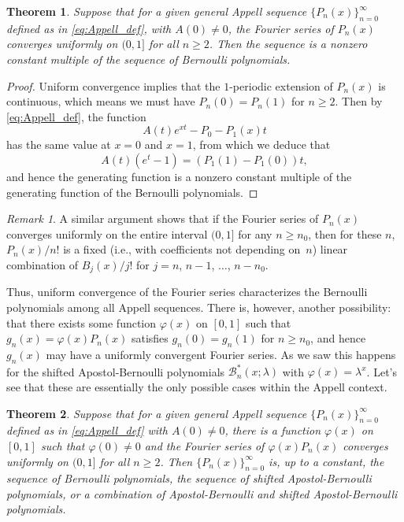 \documentclass[11pt,a4paper]{amsart}
\newcommand{\AB}{\mathcal{B}}
\theoremstyle{plain}
\newtheorem{theorem}{Theorem}
\theoremstyle{plain}
\theoremstyle{plain}
\theoremstyle{remark}
\newtheorem*{remark}{Remark}
\begin{document}
\begin{theorem}
\label{T:BernUnif}
Suppose that for a given general Appell sequence $\{P_{n}(x)\}_{n=0}^\infty$ defined as in \eqref{eq:Appell_def}, with $A(0) \ne 0$, the Fourier series of $P_{n}(x)$ converges uniformly on $(0,1]$ for all $n \ge 2$. Then the sequence is a nonzero constant multiple of the sequence of Bernoulli polynomials.
\end{theorem}


\begin{proof}
Uniform convergence implies that the $1$-periodic extension of $P_{n}(x)$ is continuous, which means we must have $P_n(0)=P_n(1)$ for $n \ge 2$. Then by \eqref{eq:Appell_def}, the function
\[
  A(t)e^{xt}-P_0-P_1(x)t
\]
has the same value at $x=0$ and $x=1$, from which we deduce that
\[
  A(t)(e^t-1) = (P_1(1)-P_1(0))t,
\]
and hence the generating function is a nonzero constant multiple of the generating function of the Bernoulli polynomials.
\end{proof}


\begin{remark}
\label{R:BernUnif}
A similar argument shows that if the Fourier series of $P_{n}(x)$ converges uniformly on the entire interval $(0,1]$ for any $n \ge n_{0}$, then for these $n$,
$P_{n}(x)/n!$ is a fixed (i.e., with coefficients not depending on~$n$)
linear combination of $B_j(x)/j!$ for $j=n$, $n-1$, $\dots$, $n-n_0$.
\end{remark}

Thus, uniform convergence of the Fourier series characterizes the Bernoulli polynomials among all Appell sequences. There is, however, another possibility: that there exists some function $\varphi(x)$ on $[0,1]$ such that $g_n(x) = \varphi(x)P_n(x)$ satisfies $g_n(0)=g_n(1)$ for $n\ge n_0$, and hence $g_n(x)$ may have a uniformly convergent Fourier series. As we saw this happens for the shifted Apostol-Bernoulli polynomials $\AB^*_n(x;\lambda)$ with $\varphi(x)=\lambda^x$. Let's see that these are essentially the only possible cases within the Appell context.

\begin{theorem}
\label{T:SoloAB}
Suppose that for a given general Appell sequence $\{P_{n}(x)\}_{n=0}^\infty$ defined as in \eqref{eq:Appell_def} with $A(0) \ne 0$, there is a function $\varphi(x)$ on $[0,1]$ such that $\varphi(0) \neq 0$ and the Fourier series of $\varphi(x)P_{n}(x)$ converges uniformly on $(0,1]$ for all $n \ge 2$.
Then $\{P_{n}(x)\}_{n=0}^{\infty}$ is, up to a constant, the sequence of Bernoulli polynomials, the sequence of shifted Apostol-Bernoulli polynomials, or a combination of Apostol-Bernoulli and shifted Apostol-Bernoulli polynomials.
\end{theorem}
\end{document}
